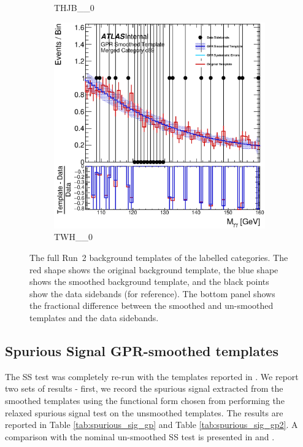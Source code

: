 \begin{figure}
\begin{center}
\begin{subfigure}[T]{0.49\linewidth}
	\caption{THJB\_\_0}
\end{subfigure}
\begin{subfigure}[T]{0.49\linewidth}
	\centering
	\includegraphics[width=\linewidth]{figures/background/gpr/coupCatTemplates/GPR_Smoothed_Plot_hmgg_c89.eps}
	\caption{TWH\_\_0}
\end{subfigure}
\caption{The full Run~2 background templates of the labelled categories. The red shape shows the original background template, the blue shape shows the smoothed background template, and the black points show the data sidebands (for reference). The bottom panel shows the fractional difference between the smoothed and un-smoothed templates and the data sidebands. }
 \label{fig:gpr_coupcat_22}
 \end{center}
\end{figure}

\subsection{Spurious Signal GPR-smoothed templates}
\label{ssec:GPR_SS}

The SS test was completely re-run with the templates reported in \Figrange{\ref{fig:gpr_coupcat_1}}{\ref{fig:gpr_coupcat_22}}. 
We report two sets of results - first, we record the spurious signal extracted from the smoothed templates using the functional form chosen from performing the relaxed spurious signal test on the unsmoothed templates. The results are reported in Table \ref{tab:spurious_sig_gp} and Table \ref{tab:spurious_sig_gp2}. A comparison with the nominal un-smoothed SS test is presented in \Tab{\ref{tab:comp_smooth_unsmooth1}} and \Tab{\ref{tab:comp_smooth_unsmooth2}}.

